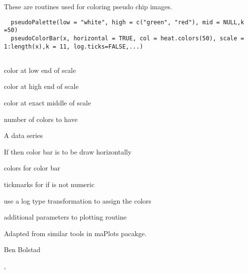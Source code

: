 \begin{Description}\relax
These are routines used for coloring pseudo chip images.
\end{Description}
\begin{Usage}
\begin{verbatim}
  pseudoPalette(low = "white", high = c("green", "red"), mid = NULL,k =50) 
  pseudoColorBar(x, horizontal = TRUE, col = heat.colors(50), scale = 1:length(x),k = 11, log.ticks=FALSE,...)
  
\end{verbatim}
\end{Usage}
\begin{Arguments}
\begin{ldescription}
\item[\code{low}] color at low end of scale
\item[\code{high}] color at high end of scale
\item[\code{mid}] color at exact middle of scale
\item[\code{k}] number of colors to have
\item[\code{x}] A data series
\item[\code{horizontal}] If  then color bar is to be draw
horizontally
\item[\code{col}] colors for color bar
\item[\code{scale}] tickmarks for  if  is not numeric
\item[\code{log.ticks}] use a log type transformation to assign the colors
\item[\code{...}] additional parameters to plotting routine
\end{ldescription}
\end{Arguments}
\begin{Details}\relax
Adapted from similar tools in maPlots pacakge.
\end{Details}
\begin{Author}\relax
Ben Bolstad 
\end{Author}
\begin{SeeAlso}\relax
{}, 
\end{SeeAlso}

